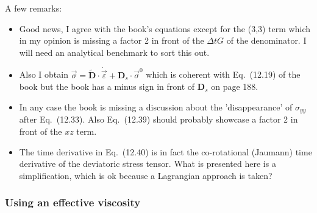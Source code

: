 A few remarks:
\begin{itemize}
\item 
Good news, I agree with the book's equations except for the (3,3)
term which in my opinion is {\color{red} missing a factor 2} in front of 
the $\Delta t G$ of the denominator.
I will need an analytical benchmark to sort this out.
\item 
Also I obtain  $\vec\sigma= \tilde{\bm D} \cdot \dot{\vec{\varepsilon}} + {\bm D}_s \cdot \vec{\sigma}^0$ which is coherent with Eq.~(12.19) of the book but the book has a minus sign in front of ${\bm D}_s$ on page 188.
\item 
In any case the book is missing a discussion about the 'disappearance' of $\sigma_{yy}$ after Eq.~(12.33).
Also Eq.~(12.39) should probably showcase a factor 2 in front of
the $xz$ term.
\item The time derivative in Eq.~(12.40) is in fact the  co-rotational (Jaumann) time derivative of the deviatoric stress tensor. What is presented here is a simplification, which is ok because a Lagrangian approach is taken?
\end{itemize}

\subsubsection*{Using an effective viscosity}

